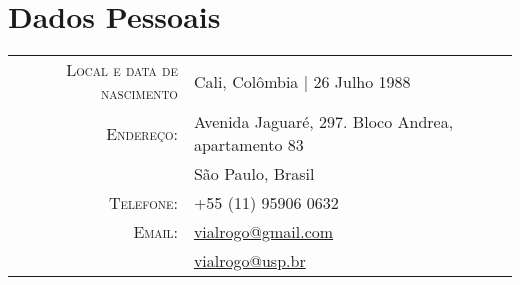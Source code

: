 \documentclass[a4paper,10pt]{article}
\begin{document}
\pagestyle{empty} %

\par{\bigskip\par}

\section{Dados Pessoais}

\begin{tabular}{rl}
  \textsc{Local e data de nascimento}   & Cali, Colômbia  | 26 Julho 1988 \\
  \textsc{Endereço:}                    & Avenida Jaguaré, 297. Bloco Andrea, apartamento 83\\
                                        & São Paulo, Brasil\\
  \textsc{Telefone:}                    & +55 (11) 95906 0632 \\
  \textsc{Email:}                       & \href{mailto:vialrogo@gmail.com}{vialrogo@gmail.com} \\
                                        & \href{mailto:vialrogo@usp.br}{vialrogo@usp.br} \\
\end{tabular}

\end{document}
